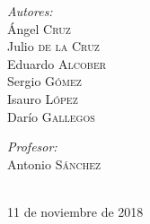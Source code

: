 \documentclass[12pt]{article}
\begin{document}
\begin{titlepage}

\begin{minipage}{0.4\textwidth}
\begin{flushleft} \large
\emph{Autores:}\\
Ángel \textsc{Cruz} \\ %
Julio \textsc{de la Cruz} \\
Eduardo \textsc{Alcober}\\
Sergio \textsc{Gómez}\\
Isauro \textsc{López}\\
Darío \textsc{Gallegos}
\end{flushleft}
\end{minipage}
\begin{minipage}{0.4\textwidth}
\begin{flushright} \large
\emph{Profesor:} \\
Antonio \textsc{Sánchez} %
\end{flushright}
\end{minipage}\\[0.85cm]
{\large 11 de noviembre de 2018}\\[0.5cm] %


\vfill %

\end{titlepage}



\tableofcontents %
\newpage

\end{document}
